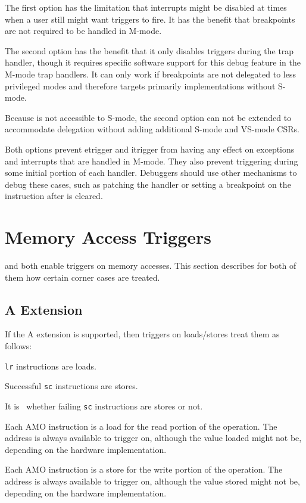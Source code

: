 \begin{commentary}
The first option has the limitation that interrupts might be disabled at
times when a user still might want triggers to fire.  It has the benefit
that breakpoints are not required to be handled in M-mode.

The second option has the benefit that it only disables triggers during
the trap handler, though it requires specific software support for this debug
feature in the M-mode trap handlers.  It can only work if breakpoints are not
delegated to less privileged modes and therefore targets primarily
implementations without S-mode.

Because \RcsrTcontrol is not accessible to S-mode, the second option can
not be extended to accommodate delegation without adding additional S-mode
and VS-mode CSRs.

Both options prevent etrigger and itrigger from having any effect on
exceptions and interrupts that are handled in M-mode.  They also prevent
triggering during some initial portion of each handler.  Debuggers should
use other mechanisms to debug these cases, such as patching the handler
or setting a breakpoint on the instruction after \FcsrMstatusMie is cleared.
\end{commentary}

\section{Memory Access Triggers}

\RcsrMcontrol and \RcsrMcontrolSix both enable triggers on memory accesses. This
section describes for both of them how certain corner cases are treated.

\subsection{A Extension}

\begin{steps}{If the A extension is supported, then triggers on loads/stores
treat them as follows:}
\item {\tt lr} instructions are loads.
\item Successful {\tt sc} instructions are stores.
\item It is \unspecified\ whether failing {\tt sc} instructions are stores or not.
\item Each AMO instruction is a load for the read portion of the
operation. The address is always available to trigger on, although
the value loaded might not be, depending on the hardware
implementation.
\item Each AMO instruction is a store for the write portion of the
operation. The address is always available to trigger on, although
the value stored might not be, depending on the hardware
implementation.
\end{steps}

